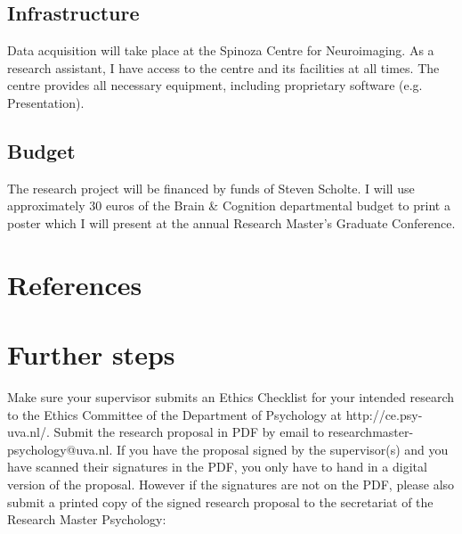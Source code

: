 \documentclass[12pt,a4paper]{article}\usepackage[]{graphicx}\usepackage[]{color}
\begin{document}
\subsection{Infrastructure}
Data acquisition will take place at the Spinoza Centre for Neuroimaging. As a research assistant, I have access to the centre and its facilities at all times. The centre provides all necessary equipment, including proprietary software (e.g. Presentation). 

\subsection{Budget}
The research project will be financed by funds of Steven Scholte. I will use approximately 30 euros of the Brain \& Cognition departmental budget to print a poster which I will present at the annual Research Master's Graduate Conference. \\

\noindent
\wordcount

\renewcommand{\bibsection}{} %
\section{References}


\section{Further steps}
Make sure your supervisor submits an Ethics Checklist for your intended research to the Ethics Committee of the Department of Psychology at http://ce.psy-uva.nl/. Submit the research proposal in PDF by email to researchmaster-psychology@uva.nl. 
If you have the proposal signed by the supervisor(s) and you have scanned their signatures in the PDF, you only have to hand in a digital version of the proposal. However if the signatures are not on the PDF, please also submit a printed copy of the signed research proposal to the secretariat of the Research Master Psychology:
\vspace{\baselineskip}
\end{document}
